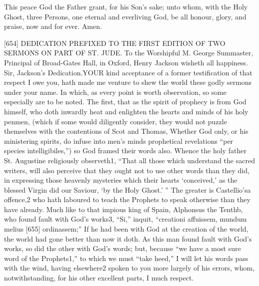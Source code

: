 This peace God the Father grant, for his Son’s sake; unto whom, with the Holy Ghost, three Persons, one eternal and everliving God, be all honour, glory, and praise, now and for ever. Amen.

[654]
DEDICATION PREFIXED TO THE FIRST EDITION OF TWO SERMONS ON PART OF ST. JUDE.
To the Worshipful M. George Summaster, Principal of Broad-Gates Hall, in Oxford, Henry Jackson wisheth all happiness.
Sir,
Jackson’s Dedication.YOUR kind acceptance of a former testification of that respect I owe you, hath made me venture to shew the world these godly sermons under your name. In which, as every point is worth observation, so some especially are to be noted. The first, that as the spirit of prophecy is from God himself, who doth inwardly heat and enlighten the hearts and minds of his holy penmen, (which if some would diligently consider, they would not puzzle themselves with the contentions of Scot and Thomas, Whether God only, or his ministering spirits, do infuse into men’s minds prophetical revelations “per species intelligibiles,”) so God framed their words also. Whence the holy father St. Augustine religiously observeth1, “That all those which understand the sacred writers, will also perceive that they ought not to use other words than they did, in expressing those heavenly mysteries which their hearts ‘conceived,’ as the blessed Virgin did our Saviour, ‘by the Holy Ghost.’ ” The greater is Castellio’sa offence,2 who hath laboured to teach the Prophets to speak otherwise than they have already. Much like to that impious king of Spain, Alphonsus the Tenthb, who found fault with God’s works3, “Si,” inquit, “creationi affuissem, mundum melius [655] ordinassem;” If he had been with God at the creation of the world, the world had gone better than now it doth. As this man found fault with God’s works, so did the other with God’s words; but, because “we have a most sure word of the Prophets1,” to which we must “take heed,” I will let his words pass with the wind, having elsewhere2 spoken to you more largely of his errors, whom, notwithstanding, for his other excellent parts, I much respect.

